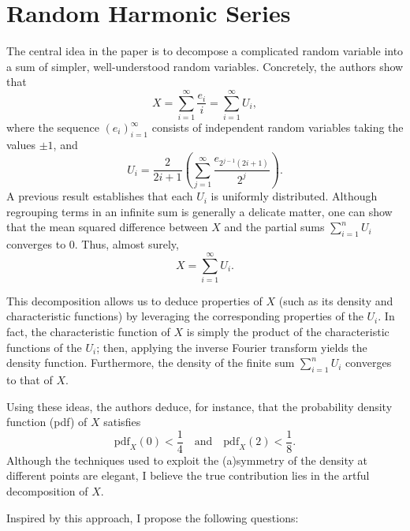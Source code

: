 \documentclass{article}
\begin{document}
\section{Random Harmonic Series}

The central idea in the paper is to decompose a complicated random variable into a sum of simpler, well-understood random variables. Concretely, the authors show that
\[
X = \sum_{i=1}^{\infty} \frac{e_i}{i} = \sum_{i=1}^{\infty} U_i,
\]
where the sequence $(e_i)_{i=1}^{\infty}$ consists of independent random variables taking the values $\pm1$, and 
\[
U_i = \frac{2}{2i+1} \left( \sum_{j=1}^{\infty} \frac{e_{2^{j-1}(2i+1)}}{2^j} \right).
\]
A previous result establishes that each $U_i$ is uniformly distributed. Although regrouping terms in an infinite sum is generally a delicate matter, one can show that the mean squared difference between 
\(\displaystyle X\) and the partial sums \(\displaystyle \sum_{i=1}^{n} U_i\) converges to 0. Thus, almost surely,
\[
X = \sum_{i=1}^{\infty} U_i.
\]

This decomposition allows us to deduce properties of \(X\) (such as its density and characteristic functions) by leveraging the corresponding properties of the \(U_i\). In fact, the characteristic function of \(X\) is simply the product of the characteristic functions of the \(U_i\); then, applying the inverse Fourier transform yields the density function. Furthermore, the density of the finite sum \(\sum_{i=1}^{n} U_i\) converges to that of \(X\).

Using these ideas, the authors deduce, for instance, that the probability density function (pdf) of \(X\) satisfies 
\[
\text{pdf}_X(0) < \frac{1}{4} \quad \text{and} \quad \text{pdf}_X(2) < \frac{1}{8}.
\]
Although the techniques used to exploit the (a)symmetry of the density at different points are elegant, I believe the true contribution lies in the artful decomposition of \(X\). 

Inspired by this approach, I propose the following questions:
\end{document}
